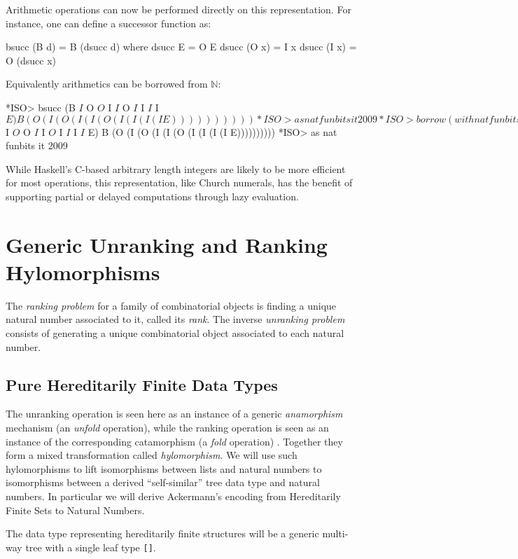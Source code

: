 \documentclass[]{INCLUDES/llncs}
\begin{document}
Arithmetic operations can now be performed directly on this representation.
For instance, one can define a successor function as:
\begin{code}
bsucc (B d) = B (dsucc d) where
  dsucc E = O E
  dsucc (O x) = I x
  dsucc (I x) = O (dsucc x) 
\end{code}
Equivalently arithmetics can be borrowed from $\mathbb{N}$:
\begin{codex}
*ISO> bsucc (B $ I $ O $ O $ I $ I $ O $ I $ I $ I $ I $ E)
B (O (I (O (I (I (O (I (I (I (I E))))))))))
*ISO> as nat funbits it
2009
*ISO> borrow (with nat funbits) 
             succ (B $ I $ O $ O $ I $ I $ O $ I $ I $ I $ I $ E)
B (O (I (O (I (I (O (I (I (I (I E))))))))))
*ISO> as nat funbits it
2009
\end{codex}
While Haskell's C-based arbitrary length integers are likely
to be more efficient for most operations, this representation, like Church
numerals, has the benefit of supporting partial or delayed computations
through lazy evaluation.

\section{Generic Unranking and Ranking Hylomorphisms}
\label{unrank}

The {\em ranking problem} for a family of
combinatorial objects is finding a unique 
natural number associated to it,
called its {\em rank}.
The inverse {\em unranking problem} consists of generating a unique
combinatorial object associated to each natural number. 

\subsection{Pure Hereditarily Finite Data Types}

The unranking operation is seen here as an instance of a generic
{\em anamorphism} mechanism (an {\em unfold} operation), while the ranking
operation is seen as an instance of the corresponding catamorphism (a {\em
fold} operation) \cite{DBLP:journals/jfp/Hutton99,DBLP:conf/fpca/MeijerH95}.
Together they form a mixed transformation called {\em hylomorphism}. 
We will use such hylomorphisms to lift isomorphisms between lists
and natural numbers to isomorphisms between a derived ``self-similar'' tree
data type and natural numbers.
In particular we will derive Ackermann's encoding
from Hereditarily Finite Sets to Natural Numbers.

The data type representing hereditarily finite structures will be
a generic multi-way tree with a single leaf type {\tt []}.
\end{document}
